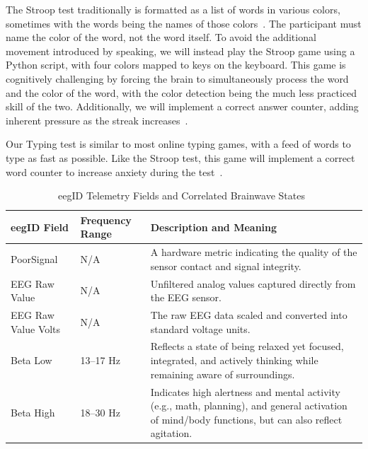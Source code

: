 \documentclass[journal]{IEEEtran}
\begin{document}
The Stroop test traditionally is formatted as a list of words in various colors, sometimes with the words being the names of those colors~\cite{macleodHalfCenturyResearch1991}. The participant must name the color of the word, not the word itself. To avoid the additional movement introduced by speaking, we will instead play the Stroop game using a Python script, with four colors mapped to keys on the keyboard. This game is cognitively challenging by forcing the brain to simultaneously process the word and the color of the word, with the color detection being the much less practiced skill of the two. Additionally, we will implement a correct answer counter, adding inherent pressure as the streak increases~\cite{yamadaExperimentalParadigmManipulate2025}.

Our Typing test is similar to most online typing games, with a feed of words to type as fast as possible. Like the Stroop test, this game will implement a correct word counter to increase anxiety during the test~\cite{yamadaExperimentalParadigmManipulate2025}.

\begin{table}[t]
    \centering
    \caption{eegID Telemetry Fields and Correlated Brainwave States~\cite{isomerprogrammingllcEegID2015,neuroskyNeuroSkyMindWaveMobile2018}}
    \label{tab:eegid_brainwaves}
    \begin{tabularx}{\textwidth}{l l X}
        \hline
        \textbf{eegID Field} & \textbf{Frequency Range} & \textbf{Description and Meaning} \\
        \hline
        PoorSignal & N/A & A hardware metric indicating the quality of the sensor contact and signal integrity. \\
        EEG Raw Value & N/A & Unfiltered analog values captured directly from the EEG sensor. \\
        EEG Raw Value Volts & N/A & The raw EEG data scaled and converted into standard voltage units. \\
        Beta Low & 13--17 Hz & Reflects a state of being relaxed yet focused, integrated, and actively thinking while remaining aware of surroundings. \\
        Beta High & 18--30 Hz & Indicates high alertness and mental activity (e.g., math, planning), and general activation of mind/body functions, but can also reflect agitation. \\
        \hline
    \end{tabularx}
\end{table}
\end{document}
